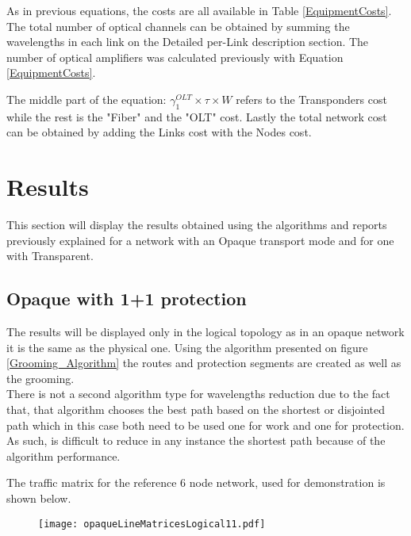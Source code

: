 \documentclass[12pt, a4paper]{article}
\begin{document}
	As in previous equations, the costs are all available in Table \ref{EquipmentCosts}. The total number of optical channels can be obtained by summing the wavelengths in each link on the Detailed per-Link description section. The number of optical amplifiers was calculated previously with Equation \ref{EquipmentCosts}.
	
	The middle part of the equation: $\gamma_1^{OLT} \times \tau \times W$ refers to the Transponders cost while the rest is the "Fiber" and the "OLT" cost.	Lastly the total network cost can be obtained by adding the Links cost with the Nodes cost.\\
	
	\section{Results}
	This section will display the results obtained using the algorithms and reports previously explained for a network with an Opaque transport mode and for one with Transparent.

	
	\subsection{Opaque with 1+1 protection}
	
	The results will be displayed only in the logical topology as in an opaque network it is the same as the physical one.
	Using the algorithm presented on figure \ref{Grooming_Algorithm} the routes and protection segments are created as well as the grooming. \\
	
	There is not a second algorithm type for wavelengths reduction due to the fact that, that algorithm chooses the best path based on the shortest or disjointed path which in this case both need to be used one for work and one for protection. As such, is difficult to reduce in any instance the shortest path because of the algorithm performance.
	
	The traffic matrix for the reference 6 node network, used for demonstration is shown below.
	
	\begin{figure}[h!]
		\centering
		\texttt{[image: opaqueLineMatricesLogical11.pdf]}	
		\caption{}
		\label{opaqueLineMatricesLogical11}								
	\end{figure}	
	
\end{document}
